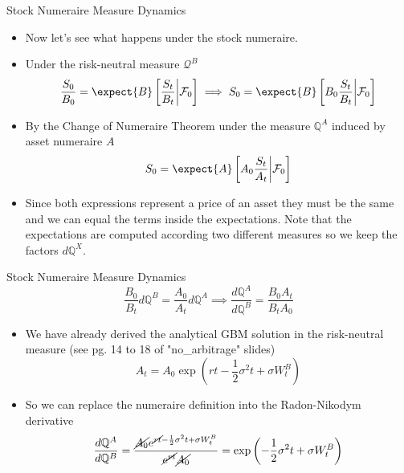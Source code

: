\documentclass{beamer}
\begin{document}
\begin{frame}{Stock Numeraire Measure Dynamics}
  \begin{itemize}
  \item<1-> Now let's see what happens under the stock numeraire.
  \item<2-> Under the risk-neutral measure $\mathcal{Q}^B$
    \begin{equation*}
      \frac{S_0}{B_0} = \expect{B}\left[\frac{S_t}{B_t}\bigg|\mathcal{F}_0\right] \implies
      S_0 = \expect{B}\left[B_0\frac{S_t}{B_t}\bigg|\mathcal{F}_0\right]
    \end{equation*}
  \item<3-> By the Change of Numeraire Theorem under the measure $\mathbb{Q}^A$ induced by asset numeraire $A$
    \begin{equation*}
      S_0 = \expect{A}\left[A_0\frac{S_t}{A_t}\bigg|\mathcal{F}_0\right]
    \end{equation*}
  \item<4-> Since both expressions represent a price of an asset they must be the same and we can equal the terms inside the expectations. Note that the expectations are computed according two different measures so we keep the factors $d\mathbb{Q}^X$. 
  \end{itemize}
\end{frame}

\begin{frame}{Stock Numeraire Measure Dynamics}
  \begin{equation*}
    \frac{B_0}{B_t}d\mathbb{Q}^B = \frac{A_0}{A_t}d\mathbb{Q}^A\implies \frac{d\mathbb{Q}^A}{d\mathbb{Q}^B}=\frac{B_0A_t}{B_tA_0}
  \end{equation*}
  \begin{itemize}
  \item<2-> We have already derived the analytical GBM solution in the risk-neutral measure (see pg. 14 to 18 of "no\_arbitrage" slides)
    \begin{equation*} 
      A_t = A_0 \exp\left(rt-\frac{1}{2}\sigma^2 t + \sigma W^B_t\right)
    \end{equation*}
    \item<3-> So we can replace the numeraire definition into the Radon-Nikodym derivative
    \begin{equation*}
      \frac{d\mathbb{Q}^A}{d\mathbb{Q}^B}=\frac{\cancel{A_0}e^{\cancel{rt}-\frac{1}{2}\sigma^2 t + \sigma W^B_t}}{\cancel{e^{rt}}\cancel{A_0}}=\exp\left(-\frac{1}{2}\sigma^2 t + \sigma W^B_t\right)
    \end{equation*}
  \end{itemize}
\end{frame}
\end{document}
